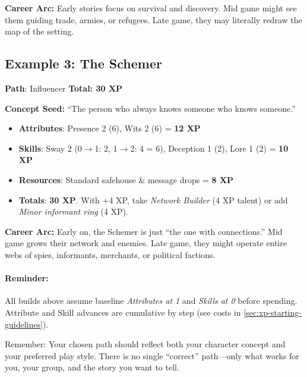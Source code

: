 \noindent\textbf{Career Arc:} Early stories focus on survival and discovery. Mid
game might see them guiding trade, armies, or refugees. Late game, they may
literally redraw the map of the setting.

\subsection*{Example 3: The Schemer}
\label{sec:xp-ex-schemer}

\textbf{Path}: Influencer \quad \textbf{Total: 30 XP}

\medskip

\noindent\textbf{Concept Seed:} ``The person who always knows someone who knows someone.''

\begin{itemize}
\item \textbf{Attributes}: Presence 2 (6), Wits 2 (6) = \textbf{12 XP}
\item \textbf{Skills}: Sway 2 (0$\to$1: 2, 1$\to$2: 4 = 6), Deception 1 (2), Lore 1 (2) = \textbf{10 XP}
\item \textbf{Resources}: Standard safehouse \& message drops = \textbf{8 XP}
\item \textbf{Totals}: \textbf{30 XP}. With +4 XP, take \emph{Network Builder} (4 XP talent) or add \emph{Minor informant ring} (4 XP).
\end{itemize}

\noindent\textbf{Career Arc:} Early on, the Schemer is just ``the one with
connections.'' Mid game grows their network and enemies. Late game, they might
operate entire webs of spies, informants, merchants, or political factions.

\paragraph{Reminder:}
All builds above assume baseline \emph{Attributes at 1} and \emph{Skills at 0}
before spending. Attribute and Skill advances are cumulative by step (see costs
in \ref{sec:xp-starting-guidelines}).

Remember: Your chosen path should reflect both your character concept and your
preferred play style. There is no single ``correct'' path—only what works for
you, your group, and the story you want to tell.



